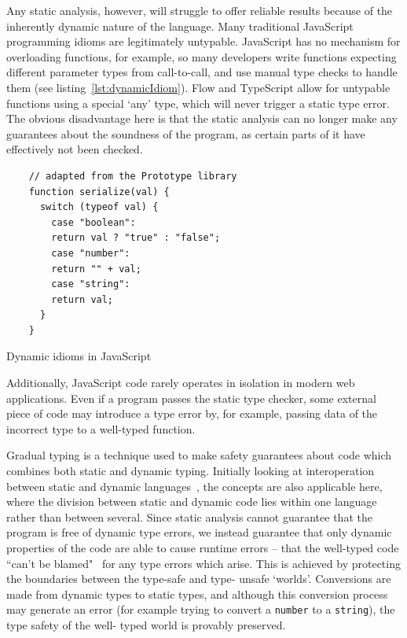 \documentclass[12pt,a4paper,twoside,openright]{report}
\theoremstyle{definition}
\theoremstyle{dotless}
\begin{document}
Any static analysis, however, will struggle to offer reliable results because
of the inherently dynamic nature of the language. Many traditional JavaScript
programming idioms are legitimately untypable. JavaScript has no
mechanism for overloading functions, for example, so many developers write
functions expecting different parameter types from call-to-call, and use manual
type checks to handle them (see listing~\ref{lst:dynamicIdiom}). Flow and
TypeScript allow for untypable functions using a special `any' type, which will
never trigger a static type error. The obvious disadvantage here is that the
static analysis can no longer make any guarantees about the soundness of the
program, as certain parts of it have effectively not been checked.
\begin{program}[t]
  \begin{verbatim}
 	// adapted from the Prototype library
 	function serialize(val) {
	  switch (typeof val) {
		case "boolean":
		return val ? "true" : "false";
		case "number":
		return "" + val;
		case "string":
		return val;
	  }
 	}	
  \end{verbatim}
  \label{lst:dynamicIdiom}
  \caption{Dynamic idioms in JavaScript}
\end{program}
Additionally, JavaScript code rarely operates in isolation in modern web
applications. Even if a program passes the static type checker, some external
piece of code may introduce a type error by, for example, passing data of the
incorrect type to a well-typed function.

Gradual typing is a technique used to make safety guarantees about code which
combines both static and dynamic typing. Initially looking at interoperation
between static and dynamic languages~\cite{gray2005fine}, the concepts are
also applicable here, where the division between static and dynamic code lies
within one language rather than between several. Since static analysis cannot
guarantee that the program is free of dynamic type errors, we instead
guarantee that only dynamic properties of the code are able to cause runtime
errors -- that the well-typed code ``can't be blamed"~\cite{cantblame} for
any type errors which arise. This is achieved by protecting the boundaries
between the type-safe and type- unsafe `worlds'. Conversions are made from
dynamic types to static types, and although this conversion process may
generate an error (for example trying to convert a \texttt{number} to a
\texttt{string}), the type safety of the well- typed world is provably
preserved.
\end{document}
